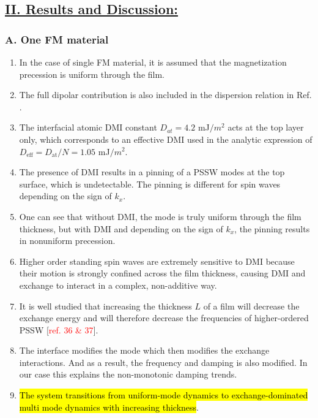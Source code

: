 \subsection*{\underline{II. Results and Discussion:}}
\subsubsection*{\centering A. One FM material}
\begin{enumerate}
    \item In the case of single FM material, it is assumed that the magnetization precession is uniform through the film.
    \item The full dipolar contribution is also included in the dispersion relation in Ref. \cite{moon2013spin}.
    \item The interfacial atomic DMI constant $D_{at}=4.2$ mJ$/m^2$ acts at the top layer only, which corresponds to an effective DMI used in the analytic expression of $D_{\mathrm{eff}}=D_{\mathrm{at}}/N=1.05$ mJ$/m^2$.
    \item The presence of DMI results in a pinning of a PSSW modes at the top surface, which is undetectable. The pinning is different for spin waves depending on the sign of $k_x$.
    \item One can see that without DMI, the mode is truly uniform through the film thickness, but with DMI and depending on the sign of $k_x$, the pinning results in nonuniform precession.
    \item Higher order standing spin waves are extremely sensitive to DMI because their motion is strongly confined across the film thickness, causing DMI and exchange to interact in a complex, non-additive way.
    \item It is well studied that increasing the thickness $L$ of a film will decrease the exchange energy and will therefore decrease the frequencies of higher-ordered PSSW [\textcolor{red}{ref. 36 \& 37}].
    \item The interface modifies the mode which then modifies the exchange interactions. And as a result, the frequency and damping is also modified. In our case this explains the non-monotonic damping trends.
    \item \hl{The system transitions from uniform-mode dynamics to exchange-dominated multi mode dynamics with increasing thickness}.
\end{enumerate}
